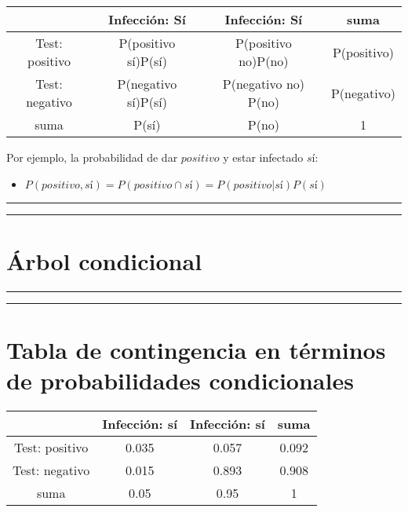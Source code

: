 \documentclass[
]{book}
\providecommand{\tightlist}{%
  \setlength{\itemsep}{0pt}\setlength{\parskip}{0pt}}
\begin{document}
\begin{longtable}[]{@{}cccc@{}}
\toprule
& Infección: Sí & Infección: Sí & suma \\
\midrule
\endhead
Test: positivo & P(positivo {\textbar{}} sí)P(sí) & P(positivo {\textbar{}} no)P(no) & P(positivo) \\
Test: negativo & P(negativo {\textbar{}} sí)P(sí) & P(negativo {\textbar{}} no) P(no) & P(negativo) \\
suma & P(sí) & P(no) & 1 \\
\bottomrule
\end{longtable}

Por ejemplo, la probabilidad de dar \(positivo\) y estar infectado \(sí\):

\begin{itemize}
\tightlist
\item
  \(P(positivo, sí)=P(positivo \cap sí) = P(positivo|sí) P(sí)\)
\end{itemize}

\begin{center}\rule{0.5\linewidth}{0.5pt}\end{center}

\begin{center}\rule{0.5\linewidth}{0.5pt}\end{center}

\hypertarget{uxe1rbol-condicional}{%
\section{Árbol condicional}\label{uxe1rbol-condicional}}

\begin{center}\rule{0.5\linewidth}{0.5pt}\end{center}

\begin{center}\rule{0.5\linewidth}{0.5pt}\end{center}

\hypertarget{tabla-de-contingencia-en-tuxe9rminos-de-probabilidades-condicionales-1}{%
\section{Tabla de contingencia en términos de probabilidades condicionales}\label{tabla-de-contingencia-en-tuxe9rminos-de-probabilidades-condicionales-1}}

\begin{longtable}[]{@{}cccc@{}}
\toprule
& Infección: sí & Infección: sí & suma \\
\midrule
\endhead
Test: positivo & 0.035 & 0.057 & 0.092 \\
Test: negativo & 0.015 & 0.893 & 0.908 \\
suma & 0.05 & 0.95 & 1 \\
\bottomrule
\end{longtable}
\end{document}
